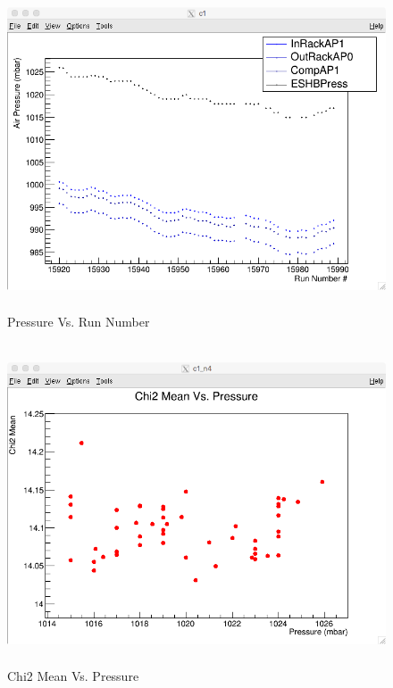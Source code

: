 \documentclass[./Thesis]{subfiles}
\begin{document}
	 
 \begin{figure}
	\centerline{\includegraphics[height=95mm]{PressureVsRunNumber.png}}
	\caption[Pressure Vs Run Number]{Pressure Vs. Run Number}
	\label{fig:pressRun}
\end{figure} 	

	
\begin{figure}
	\centerline{\includegraphics[height=95mm]{Chi2MeanVsPressure.png}}
	\caption[Chi2 Mean Vs. Pressure]{Chi2 Mean Vs. Pressure}
	\label{fig:chiMeanPres}
\end{figure}
	 
\end{document}
